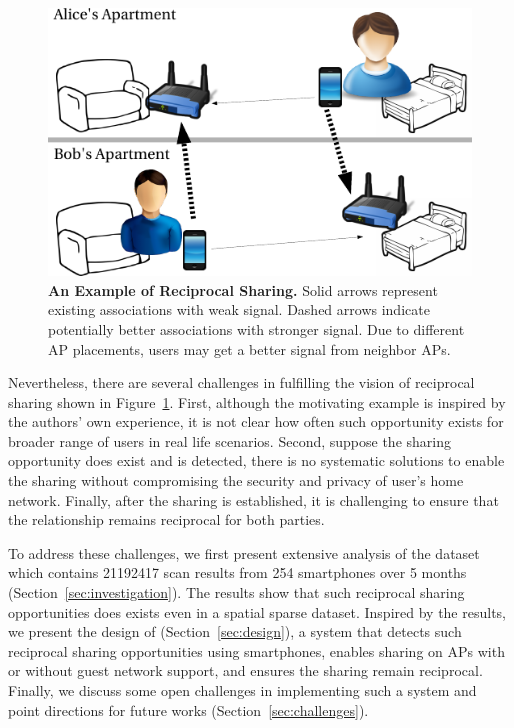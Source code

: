 \begin{figure}[t]
  \centering
  \includegraphics[width=\columnwidth]{./figures/motivation.pdf}
  \caption{\textbf{An Example of Reciprocal \wifi{} Sharing.} Solid arrows
    represent existing associations with weak signal. Dashed arrows indicate
    potentially better associations with stronger \wifi{} signal. Due to different
  AP placements, users may get a better \wifi{} signal from neighbor APs.}
  \label{fig:motivation}
\end{figure}

Nevertheless, there are several challenges in fulfilling the vision of
reciprocal \wifi{} sharing shown in Figure~\ref{fig:motivation}. First, although
the motivating example is inspired by the authors' own experience, it is not
clear how often such opportunity exists for broader range of users in real life
scenarios. Second, suppose the sharing opportunity does exist and is detected,
there is no systematic solutions to enable the \wifi{} sharing without
compromising the security and privacy of user's home network. Finally, after the
\wifi{} sharing is established, it is challenging to ensure that the
relationship remains reciprocal for both parties.

To address these challenges, we first present extensive analysis of the
\PhoneLab{} \wifi{} dataset which contains \num{21192417} scan results from 254
smartphones over 5 months (Section~\ref{sec:investigation}). The results show
that such reciprocal \wifi{} sharing opportunities does exists even in a spatial
sparse dataset. Inspired by the results, we present the design of \wisefi{}
(Section~\ref{sec:design}), a system that detects such reciprocal \wifi{}
sharing opportunities using smartphones, enables \wifi{} sharing on APs with or
without guest network support, and ensures the sharing remain reciprocal.
Finally, we discuss some open challenges in implementing such a system and point
directions for future works (Section~\ref{sec:challenges}).
